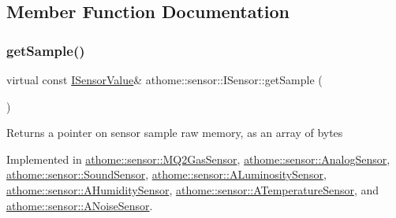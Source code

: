 \subsection{Member Function Documentation}
\mbox{\label{classathome_1_1sensor_1_1_i_sensor_ae109cd3741ea9c88dc7e4f2eaf1485d5}} 
\subsubsection{\texorpdfstring{get\+Sample()}{getSample()}}
{\footnotesize\ttfamily virtual const \mbox{\hyperlink{structathome_1_1sensor_1_1_i_sensor_1_1_i_sensor_value}{I\+Sensor\+Value}}\& athome\+::sensor\+::\+I\+Sensor\+::get\+Sample (\begin{DoxyParamCaption}{ }\end{DoxyParamCaption})\hspace{0.3cm}{\ttfamily [pure virtual]}}

Returns a pointer on sensor sample raw memory, as an array of bytes 

Implemented in \mbox{\hyperlink{classathome_1_1sensor_1_1_m_q2_gas_sensor_adbe1195490ce67fbed7c717abe2b5b13}{athome\+::sensor\+::\+M\+Q2\+Gas\+Sensor}}, \mbox{\hyperlink{classathome_1_1sensor_1_1_analog_sensor_a7ad00f985a9d1abeb64f973b5d16558c}{athome\+::sensor\+::\+Analog\+Sensor}}, \mbox{\hyperlink{classathome_1_1sensor_1_1_sound_sensor_a8ac5f417eee873247aff8a7e96e12817}{athome\+::sensor\+::\+Sound\+Sensor}}, \mbox{\hyperlink{classathome_1_1sensor_1_1_a_luminosity_sensor_a6e0e7bcfe13cd8d8edf6a09f6e230ef8}{athome\+::sensor\+::\+A\+Luminosity\+Sensor}}, \mbox{\hyperlink{classathome_1_1sensor_1_1_a_humidity_sensor_a7af4527c70b539bec58cecfaae0aa80e}{athome\+::sensor\+::\+A\+Humidity\+Sensor}}, \mbox{\hyperlink{classathome_1_1sensor_1_1_a_temperature_sensor_afea6a461b8dff9ee736aa508aa4f6a3c}{athome\+::sensor\+::\+A\+Temperature\+Sensor}}, and \mbox{\hyperlink{classathome_1_1sensor_1_1_a_noise_sensor_ab567b050b41bd0b72fcc9b94b9f6fc6e}{athome\+::sensor\+::\+A\+Noise\+Sensor}}.

\mbox{\label{classathome_1_1sensor_1_1_i_sensor_af86df8538fecfcfc670b4adfbbde6abb}} 

